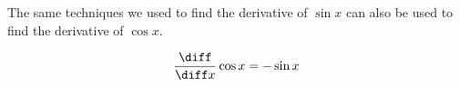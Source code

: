 \begin{frame}
The same techniques we used to find the derivative of $\sin x$ can also be used to find the derivative of $\cos x$.
\begin{theorem}
\[
\frac{\diff}{\diff x} \cos x = -\sin x
\]
\end{theorem}
\end{frame}
